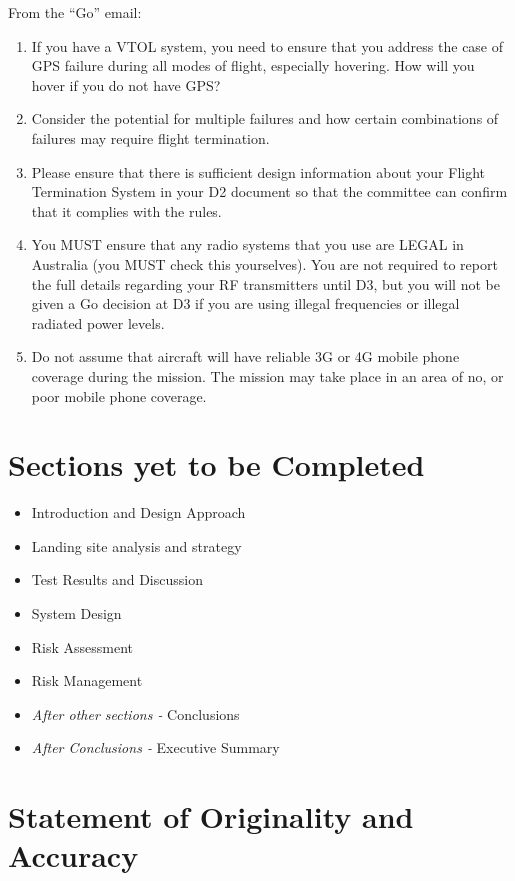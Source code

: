 \documentclass{article}
\begin{document}
From the ``Go'' email:
\begin{enumerate}
	\item If you have a VTOL system, you need to ensure that you address the case of GPS failure during all modes of flight, especially hovering. How will you hover if you do not have GPS?
	\item Consider the potential for multiple failures and how certain combinations of failures may require flight termination.
	\item Please ensure that there is sufficient design information about your Flight Termination System in your D2 document so that the committee can confirm that it complies with the rules.
	\item You MUST ensure that any radio systems that you use are LEGAL in Australia (you MUST check this yourselves). You are not required to report the full details regarding your RF transmitters until D3, but you will not be given a Go decision at D3 if you are using illegal frequencies or illegal radiated power levels.
	\item Do not assume that aircraft will have reliable 3G or 4G mobile phone coverage during the mission. The mission may take place in an area of no, or poor mobile phone coverage.
\end{enumerate}

\section{Sections yet to be Completed}
\begin{itemize}
	\item Introduction and Design Approach
	\item Landing site analysis and strategy
	\item Test Results and Discussion
	\item System Design
	\item Risk Assessment
	\item Risk Management
	\item \textit{After other sections -} Conclusions
	\item \textit{After Conclusions -} Executive Summary
\end{itemize}

\newpage

\section{Statement of Originality and Accuracy}

\end{document}
